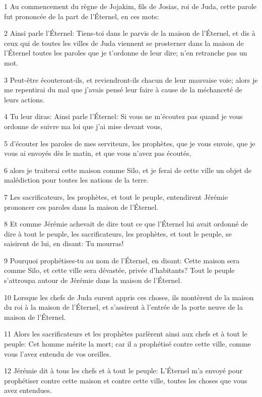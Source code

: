 \par 1 Au commencement du règne de Jojakim, fils de Josias, roi de Juda, cette parole fut prononcée de la part de l'Éternel, en ces mots:
\par 2 Ainsi parle l'Éternel: Tiens-toi dans le parvis de la maison de l'Éternel, et dis à ceux qui de toutes les villes de Juda viennent se prosterner dans la maison de l'Éternel toutes les paroles que je t'ordonne de leur dire; n'en retranche pas un mot.
\par 3 Peut-être écouteront-ils, et reviendront-ils chacun de leur mauvaise voie; alors je me repentirai du mal que j'avais pensé leur faire à cause de la méchanceté de leurs actions.
\par 4 Tu leur diras: Ainsi parle l'Éternel: Si vous ne m'écoutez pas quand je vous ordonne de suivre ma loi que j'ai mise devant vous,
\par 5 d'écouter les paroles de mes serviteurs, les prophètes, que je vous envoie, que je vous ai envoyés dès le matin, et que vous n'avez pas écoutés,
\par 6 alors je traiterai cette maison comme Silo, et je ferai de cette ville un objet de malédiction pour toutes les nations de la terre.
\par 7 Les sacrificateurs, les prophètes, et tout le peuple, entendirent Jérémie prononcer ces paroles dans la maison de l'Éternel.
\par 8 Et comme Jérémie achevait de dire tout ce que l'Éternel lui avait ordonné de dire à tout le peuple, les sacrificateurs, les prophètes, et tout le peuple, se saisirent de lui, en disant: Tu mourras!
\par 9 Pourquoi prophétises-tu au nom de l'Éternel, en disant: Cette maison sera comme Silo, et cette ville sera dévastée, privée d'habitants? Tout le peuple s'attroupa autour de Jérémie dans la maison de l'Éternel.
\par 10 Lorsque les chefs de Juda eurent appris ces choses, ils montèrent de la maison du roi à la maison de l'Éternel, et s'assirent à l'entrée de la porte neuve de la maison de l'Éternel.
\par 11 Alors les sacrificateurs et les prophètes parlèrent ainsi aux chefs et à tout le peuple: Cet homme mérite la mort; car il a prophétisé contre cette ville, comme vous l'avez entendu de vos oreilles.
\par 12 Jérémie dit à tous les chefs et à tout le peuple: L'Éternel m'a envoyé pour prophétiser contre cette maison et contre cette ville, toutes les choses que vous avez entendues.
